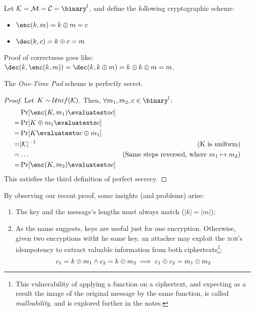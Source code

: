 Let $\K = \M = \C = \binary^l$, and define the following cryptographic scheme:
\begin{itemize}
    \item $\enc(k, m) = k \xor m = c$
    \item $\dec(k, c) = k \xor c = m$
\end{itemize}

Proof of correctness goes like: $\dec(k, \enc(k, m)) = \dec(k, k \xor m) = k \xor k \xor m = m$.

\begin{theorem}
    The \emph{One-Time Pad} scheme is perfectly secret.
\end{theorem}
\begin{proof}
    Let $K \sim \mathcal{U}nif(\mathcal{K})$. Then, $\forall m_1, m_2, c \in \binary^l$:
    \begin{align*}
        & \Pr[\enc(K, m_1) \evaluatesto c] & \\
        =& \Pr[K \xor m_1 \evaluatesto c] & \\
        =& \Pr[K \evaluatesto c \xor m_1] & \\
        =& |\K|^{-1} & \text{(K is uniform)} \\
        =& \dots & \text{(Same steps reversed, where $m_1 \mapsto m_2$)} \\
        =& \Pr[\enc(K, m_2) \evaluatesto c] &  
    \end{align*}
    This satisfies the third definition of perfect secrecy.
\end{proof}


By observing our recent proof, some insights (and problems) arise:
\begin{enumerate}
    \item The key and the message's lengths must always match ($|k| = |m|$);
    \item As the name suggests, keys are useful just for one encryption. Otherwise, given two encryptions witht he same key, an attacker may exploit the \textsc{xor}'s idempotency to extract valuable information from both ciphertexts\footnote{This vulnerability of applying a function on a ciphertext, and expecting as a result the image of the original message by the same function, is called \emph{malleability}, and is explored further in the notes.}:
    \[
        c_1 = k \oplus m_1 \wedge c_2 = k \oplus m_2 \implies c_1 \oplus c_2 = m_1 \oplus m_2
    \]
    
\end{enumerate}

